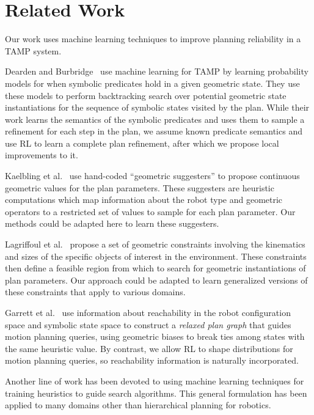 \section{Related Work}
Our work uses machine learning techniques to improve planning reliability in a TAMP system.

Dearden and Burbridge~\cite{deardenplanningtamp} use machine learning for TAMP by learning probability
models for when symbolic predicates hold in a given geometric state. They use these models to perform backtracking search
over potential geometric state instantiations for the sequence of symbolic states visited by the plan. While
their work learns the semantics of the symbolic predicates and uses them to sample a refinement for each step
in the plan, we assume known predicate semantics and use RL to learn a complete plan refinement, after which we
propose local improvements to it.

Kaelbling et al.~\cite{kaelbling2011hierarchical} use hand-coded ``geometric suggesters'' to propose
continuous geometric values for the plan parameters. These suggesters are heuristic
computations which map information about the robot type and geometric operators to a restricted
set of values to sample for each plan parameter. Our methods could be adapted here to learn these
suggesters.

Lagriffoul et al.~\cite{lagriffoul2014orientation}
propose a set of geometric constraints involving the kinematics and sizes of the specific objects of
interest in the environment. These constraints then define a feasible region from which to search
for geometric instantiations of plan parameters. Our approach could be adapted to learn generalized
versions of these constraints that apply to various domains.

Garrett et al.~\cite{GarrettWAFR14} use information about reachability in the robot configuration
space and symbolic state space to construct a \emph{relaxed plan graph} that guides motion
planning queries, using geometric biases to break ties among states with the same heuristic value.
By contrast, we allow RL to shape distributions for motion planning queries, so reachability information
is naturally incorporated.

Another line of work has been devoted to using machine learning techniques for
training heuristics to guide search algorithms. This general formulation
has been applied to many domains other than hierarchical planning for robotics.


